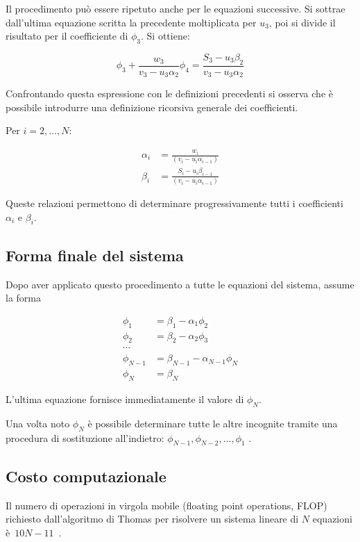 Il procedimento può essere ripetuto anche per le equazioni successive.
Si sottrae dall'ultima equazione scritta la precedente moltiplicata per $u_3$, poi si divide il risultato per il coefficiente di $\phi_3$. Si ottiene:

\[\phi_3 + \frac{w_3}{v_3 - u_3 \alpha_2}\phi_4 =
\frac{S_3 - u_3 \beta_2}{v_3 - u_3 \alpha_2}\]

Confrontando questa espressione con le definizioni precedenti si osserva che è possibile introdurre una definizione ricorsiva generale dei coefficienti.

Per $i=2,\dots,N$:

\begin{align}
	\alpha_i &=
	\frac{w_i}{(v_i - u_i \alpha_{i-1})}
	\tag{16}\\
	\beta_i &=
	\frac{S_i - u_i \beta_{i-1}}
	{(v_i - u_i \alpha_{i-1})}
	\tag{17}
\end{align}

Queste relazioni permettono di determinare progressivamente tutti i coefficienti $\alpha_i$ e $\beta_i$.

\subsection*{Forma finale del sistema}

Dopo aver applicato questo procedimento a tutte le equazioni del sistema, assume la forma

\[\begin{aligned}
	\phi_1 &= \beta_1 - \alpha_1 \phi_2 \\
	\phi_2 &= \beta_2 - \alpha_2 \phi_3 \\
	\cdots \\
	\phi_{N-1} &= \beta_{N-1} - \alpha_{N-1} \phi_N \\
	\phi_N &= \beta_N
\end{aligned}\]

L'ultima equazione fornisce immediatamente il valore di $\phi_N$.

Una volta noto $\phi_N$ è possibile determinare tutte le altre incognite tramite una procedura di sostituzione all'indietro: $\phi_{N-1}, \phi_{N-2}, \dots, \phi_1$ .


\subsection*{Costo computazionale}


Il numero di operazioni in virgola mobile (floating point operations, FLOP) richiesto dall'algoritmo di Thomas per risolvere un sistema lineare di $N$ equazioni è $\boxed{\, 10N - 11\, }$ .

